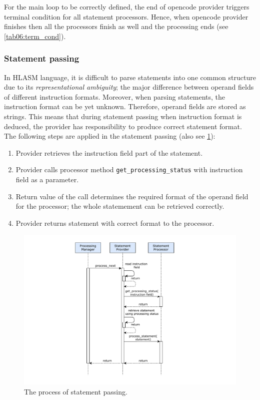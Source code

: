 For the main loop to be correctly defined, the end of opencode provider triggers terminal condition for all statement processors. Hence, when opencode provider finishes then all the processors finish as well and the processing ends (see \cref{tab06:term_cond}).

\subsubsection{Statement passing}
\label{lab06:proc_stat}

In HLASM language, it is difficult to parse statements into one common structure due to its \emph{representational ambiguity}; the major difference between operand fields of different instruction formats. Moreover, when parsing statements, the instruction format can be yet unknown. Therefore, operand fields are stored as strings. This means that during statement passing when instruction format is deduced, the provider has responsibility to produce correct statement format. The following steps are applied in the statement passing (also see \cref{fig06:process_next}):

\begin{enumerate}
	\item Provider retrieves the instruction field part of the statement.
	\item Provider calls processor method \texttt{get\_processing\_status} with instruction field as a parameter.
	\item Return value of the call determines the required format of the operand field for the processor; the whole statemement can be retrieved correctly.
	\item Provider returns statement with correct format to the processor. 
\end{enumerate}

\begin{figure}
	\centering
	\includegraphics[width=13cm]{img/process_next}
	\caption{The process of statement passing.}
	\label{fig06:process_next}
\end{figure}


